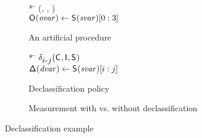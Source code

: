 \begin{figure}
\begin{subfigure}[t]{0.49\linewidth}
{
\begin{tabbing}
* \= \kill
\proc{}(\ACIFn{}, \AIIFn{}, \SecFn{})\\
\>$\mathsf{O}_{}(\mathit{ovar}) \leftarrow \mathsf{S}_{}(\mathit{svar})[0:3]$
\end{tabbing}
}
\caption{An artificial procedure\label{code:dummy:proc}}
\end{subfigure}%
\begin{subfigure}[t]{0.49\linewidth}
{
\begin{tabbing}
* \= \kill
$\declassify{\declassifyLo-\declassifyHi}(\ACIFn{}, \AIIFn{}, \SecFn{})$\\
\>$\mathsf{\Delta}_{}(\mathit{dvar}) \leftarrow \mathsf{S}_{}(\mathit{svar})[i:j]$
\end{tabbing}
}
\caption{Declassification policy\label{code:dummy:declass}}  
\end{subfigure}
\centering
\begin{subfigure}{\linewidth}
\begin{center}
\resizebox{0.65\linewidth}{!}{\protect\small}
\caption{Measurement with vs. without declassification\label{fig:jaccardWithDeclass:dummy}}
\end{center}
\end{subfigure}%
\caption{Declassification example}
\end{figure}

